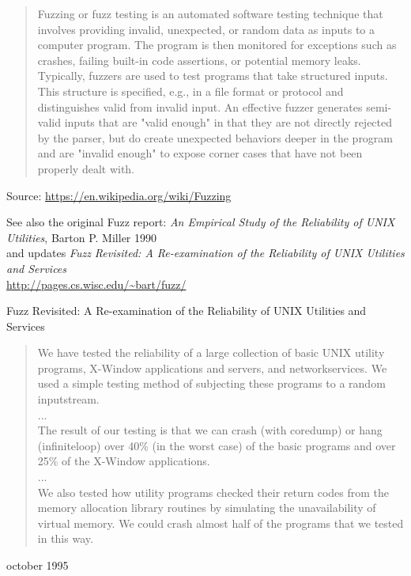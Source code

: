 \documentclass[Screen16to9,17pt]{foils}
\begin{document}
\begin{quote}
  Fuzzing or fuzz testing is an automated software testing technique that involves providing invalid, unexpected, or random data as inputs to a computer program. The program is then monitored for exceptions such as crashes, failing built-in code assertions, or potential memory leaks. Typically, fuzzers are used to test programs that take structured inputs. This structure is specified, e.g., in a file format or protocol and distinguishes valid from invalid input. An effective fuzzer generates semi-valid inputs that are "valid enough" in that they are not directly rejected by the parser, but do create unexpected behaviors deeper in the program and are "invalid enough" to expose corner cases that have not been properly dealt with.
\end{quote}
Source: \url{https://en.wikipedia.org/wiki/Fuzzing}

See also the original Fuzz report: \emph{An Empirical Study of the Reliability
of UNIX Utilities}, Barton P. Miller 1990\\
and updates \emph{Fuzz Revisited: A Re-examination of the Reliability
of UNIX Utilities and Services}\\
\url{http://pages.cs.wisc.edu/~bart/fuzz/}


Fuzz Revisited: A Re-examination of the Reliability
of
UNIX Utilities and Services

\begin{quote}
We have tested the reliability of a large collection of basic UNIX utility programs, X-Window
applications and servers, and networkservices. We used a simple testing method of subjecting these
programs to a random inputstream.\\
...\\
The result of our testing is that we can crash (with coredump) or hang (infiniteloop) over 40\% (in the
worst case) of the basic programs and over 25\% of the X-Window applications.\\
...\\
We also tested how utility programs checked their return codes from the memory allocation library
routines by simulating the unavailability of virtual memory. We could crash almost half of the programs
that we tested in this way.
\end{quote}

\centerline{october 1995}



\end{document}
